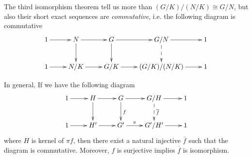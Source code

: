 \begin{rem}
  The third isomorphism theorem tell us more than $(G/K)/(N/K)\cong G/N$, but also their short exact sequences are \emph{\red  commutative}, i.e. the following diagram is commutative
\begin{displaymath}
   \xymatrix{
     {1} \ar[r]  &
      {N} \ar[r]^{} \ar[d] &
       {G} \ar[r]^{} \ar[d] &
        {G/N} \ar[r] \ar@{-->}[d] &
         {1} \\
     {1} \ar[r]  &
      {N/K} \ar[r] &
       {G/K} \ar[r] &
        {(G/K)/(N/K)} \ar[r] &
         {1}
   }
\end{displaymath}
\end{rem}
\begin{rem}
  In general, If we have the following diagram
\begin{displaymath}
   \xymatrix{
     {1} \ar[r]  &
      {H} \ar[r]^{} \ar[d] &
       {G} \ar[r]^{} \ar[d]^{f} &
        {G/H} \ar[r] \ar@{-->}[d]^{\overline{f}} &
         {1} \\
     {1} \ar[r]  &
      {H'} \ar[r] &
       {G'} \ar[r]^-{\pi} &
        {G'/H'} \ar[r] &
         {1}
   }
\end{displaymath}
where $H$ is kernel of $\pi f$, then there exist a natural injective $\overline{f}$ such that the diagram is commutative. Moreover, $f$ is surjective implies $\overline{f}$ is isomorphism.
\end{rem}
